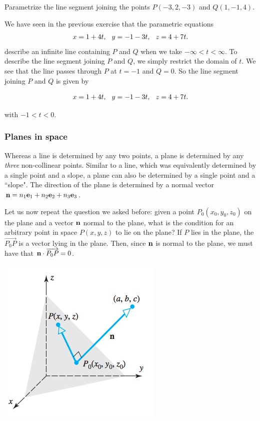 \documentclass[12pt,letterpaper,reqno]{article}
\numberwithin{equation}{section}
\newcommand{\ti}[1]{\textit{#1}}
\begin{document}
\begin{exercise}
Parametrize the line segment joining the points $P(-3,2,-3)$ and $Q(1,-1,4)$.	
\end{exercise}
{\color{red} 
We have seen in the previous exercise that the  parametric equations 
\begin{align*}
	x=1+4t, \hspace{0.25cm} y=-1-3t, \hspace{0.25cm} z=4+7t.
\end{align*}
describe an infinite line containing $P$ and $Q$ when we take $-\infty < t < \infty$. To describe the line segment joining $P$ and $Q$, we simply restrict the domain of $t$. We see that the line passes through $P$ at $t=-1$ and $Q=0$. So the line segment joining $P$ and $Q$ is given by 

\begin{align*}
	x=1+4t, \hspace{0.25cm} y=-1-3t, \hspace{0.25cm} z=4+7t.
\end{align*}

with $-1 < t < 0$.}

\subsubsection{Planes in space}
Whereas a line is determined by any two points, a plane is determined by any \ti{three} non-collinear points. Similar to a line, which was equivalently determined by a single point and a slope, a plane can also be determined by a single point and a ``slope". The direction of the plane is determined by a normal vector ${\bf n}=n_1{\bf e}_1+n_2{\bf e}_2+n_3{\bf e}_3$. 

Let us now repeat the question we asked before: given a point $P_0(x_0,y_0,z_0)$ on the plane and a vector ${\bf n}$ normal to the plane, what is the condition for an arbitrary point in space $P(x,y,z)$ to lie on the plane? If $P$ lies in the plane, the $\overrightarrow{P_0P}$ is a vector lying in the plane. Then, since ${\bf n}$ is normal to the plane, we must have that ${\bf n} \cdot \overrightarrow{P_0P}=0$.

\begin{center}
	\includegraphics[scale=0.5]{figures_mvc/vector_equation_of_a_plane}
\end{center}
\end{document}
